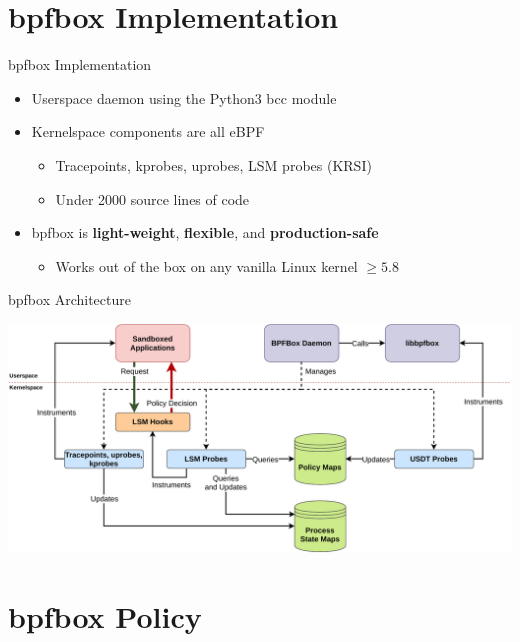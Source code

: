 \documentclass[12pt, dvipsnames]{beamer}
\begin{document}
\section{bpfbox Implementation}

\begin{frame}[c]{bpfbox Implementation}
\begin{itemize}
    \item Userspace daemon using the Python3 bcc module
    \vfill
    \item Kernelspace components are all eBPF
    \begin{itemize}
        \item Tracepoints, kprobes, uprobes, LSM probes (KRSI)
        \item Under 2000 source lines of code
    \end{itemize}
    \vfill
    \item bpfbox is \textbf{light-weight}, \textbf{flexible}, and \textbf{production-safe}
    \begin{itemize}
        \item Works out of the box on any vanilla Linux kernel $\ge 5.8$
    \end{itemize}
\end{itemize}
\end{frame}

\begin{frame}[c]{bpfbox Architecture}
\begin{center}
    \color{black}
    \includegraphics[width=1\textwidth]{figs/bpfbox-overview.pdf}
\end{center}
\end{frame}

\section{bpfbox Policy}
\end{document}

